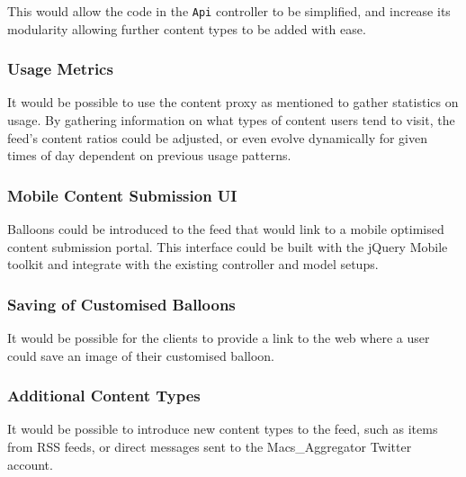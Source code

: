 This would allow the code in the \texttt{Api} controller to be simplified, and increase its modularity allowing further content types to be added with ease.

\subsubsection{Usage Metrics}
It would be possible to use the content proxy as mentioned to gather statistics on usage. By gathering information on what types of content users tend to visit, the feed's content ratios could be adjusted, or even evolve dynamically for given times of day dependent on previous usage patterns.

\subsubsection{Mobile Content Submission UI}
Balloons could be introduced to the feed that would link to a mobile optimised content submission portal. This interface could be built with the jQuery Mobile toolkit and integrate with the existing controller and model setups.

\subsubsection{Saving of Customised Balloons}
It would be possible for the clients to provide a link to the web where a user could save an image of their customised balloon.

\subsubsection{Additional Content Types}
It would be possible to introduce new content types to the feed, such as items from RSS feeds, or direct messages sent to the Macs\_Aggregator Twitter account.
